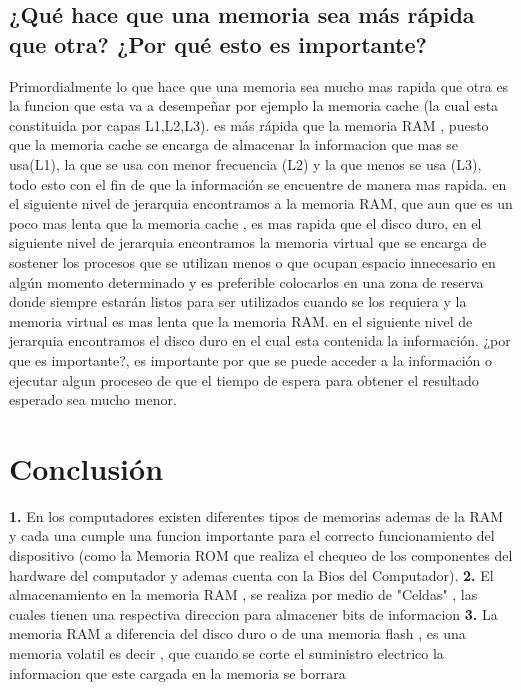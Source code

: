 \documentclass{article}
\begin{document}
\subsection{¿Qué hace que una memoria sea más rápida que otra? ¿Por qué esto es importante?}
\newline
Primordialmente lo que hace que una memoria sea mucho mas rapida que otra es la funcion que esta va a desempeñar por ejemplo la memoria cache (la cual esta constituida por capas L1,L2,L3). es más rápida que la memoria RAM , puesto que la memoria cache se encarga de almacenar la informacion que mas se usa(L1), la que se usa con menor frecuencia (L2) y la que menos se usa (L3), todo esto con el fin de que la información se encuentre de manera mas rapida.
en el siguiente nivel de jerarquia encontramos a la memoria RAM, que aun que es un poco mas lenta que la memoria cache , es mas rapida que el disco duro, en el siguiente nivel de jerarquia encontramos la memoria virtual que se encarga de sostener los procesos que se utilizan menos o que ocupan espacio innecesario en algún momento determinado y es preferible colocarlos en una zona de reserva donde siempre estarán listos para ser utilizados cuando se los requiera y la memoria virtual es mas lenta que la memoria RAM. en el siguiente nivel de jerarquia encontramos el disco duro en el cual esta contenida la información.
\newline
¿por que es importante?, es importante por que se puede acceder a la información o ejecutar algun proceseo de que el tiempo de espera para obtener el resultado esperado sea mucho menor.

\section{Conclusión} \label{conclulsion}
\newline
\textbf{1.} En los computadores existen diferentes tipos de memorias ademas de la RAM y cada una cumple una funcion importante para el correcto funcionamiento del dispositivo (como la Memoria ROM que realiza el chequeo de los componentes del hardware del computador y ademas cuenta con la Bios del Computador).
\newline
\newline
\textbf{2.} El almacenamiento en la memoria RAM , se realiza por medio de "Celdas" , las cuales tienen una respectiva direccion para almacener bits de informacion
\newline
\newline
\textbf{3.} La memoria RAM a diferencia del disco duro o de una memoria flash , es una memoria volatil es decir , que cuando se corte el suministro electrico la informacion que este cargada en la memoria se borrara


\end{document}
